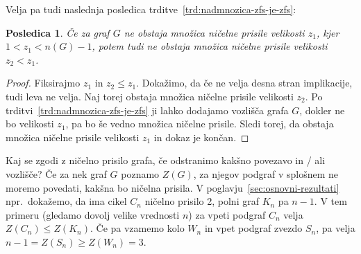 \documentclass[12pt,a4paper,twoside]{article}
\theoremstyle{definition} %
\theoremstyle{plain} %
\newtheorem{posledica}[definicija]{Posledica}
\numberwithin{equation}{section}  %
\begin{document}
Velja pa tudi naslednja posledica trditve~\ref{trd:nadmnozica-zfs-je-zfs}:
\begin{posledica}
    \label{posl:ne-obstaja-manjsi-zfs}
    Če za graf $G$ ne obstaja množica ničelne prisile velikosti $z_1$, kjer $1 < z_1 < n(G)-1$, potem tudi ne obstaja množica ničelne prisile velikosti $z_2 < z_1$.
\end{posledica}
\begin{proof}
    Fiksirajmo $z_1$ in $z_2 \leq z_1$. Dokažimo, da če ne velja desna stran implikacije, tudi leva ne velja. Naj torej obstaja množica ničelne prisile velikosti $z_2$. Po trditvi~\ref{trd:nadmnozica-zfs-je-zfs} ji lahko dodajamo vozlišča grafa $G$, dokler ne bo velikosti $z_1$, pa bo še vedno množica ničelne prisile. Sledi torej, da obstaja množica ničelne prisile velikosti $z_1$ in dokaz je končan. 
\end{proof}

Kaj se zgodi z ničelno prisilo grafa, če odstranimo kakšno povezavo in / ali vozlišče? Če za nek graf $G$ poznamo $Z(G)$, za njegov podgraf v splošnem ne moremo povedati, kakšna bo ničelna prisila. V poglavju~\ref{sec:osnovni-rezultati} npr.~dokažemo, da ima cikel $C_n$ ničelno prisilo 2, polni graf $K_n$ pa $n-1$. V tem primeru (gledamo dovolj velike vrednosti $n$) za vpeti podgraf $C_n$ velja $Z(C_n) \leq Z(K_n)$. Če pa vzamemo kolo $W_n$ in vpet podgraf zvezdo $S_n$, pa velja $n-1 = Z(S_n) \geq Z(W_n) = 3$.

\end{document}
